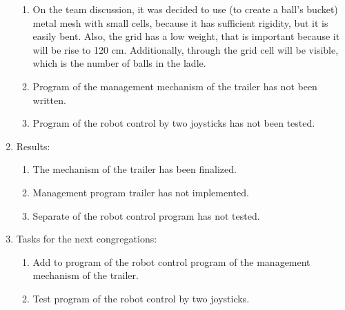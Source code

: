 \begin{enumerate}
\begin{enumerate}
		\item On the team discussion, it was decided to use (to create a ball's bucket) metal mesh with small cells, because it has sufficient rigidity, but it is easily bent. Also, the grid has a low weight, that is important because it will be rise to 120 cm. Additionally, through the grid cell will be visible, which is the number of balls in the ladle.
		
		\item Program of the management mechanism of the trailer has not been written.
		
		\item Program of the robot control by two joysticks has not been tested.
		
	\end{enumerate}
	
	\item Results:
	\begin{enumerate}
		\item The mechanism of the trailer has been finalized.
		
		\item Management program trailer has not implemented.
		
		\item Separate of the robot control program has not tested.
		
	\end{enumerate}
	
	\item Tasks for the next congregations:
	\begin{enumerate}
		\item Add to program of the robot control program of the management mechanism of the trailer.
		
		\item Test program of the robot control by two joysticks.
		
	\end{enumerate}     
\end{enumerate}
\fillpage

